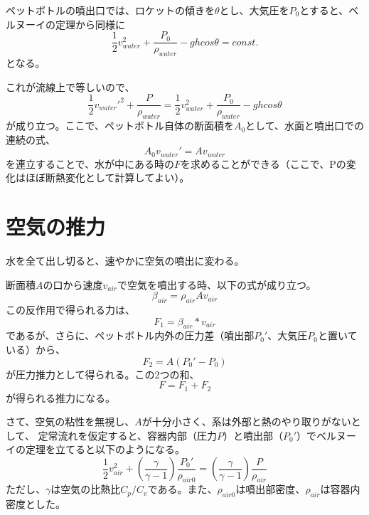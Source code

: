 \documentclass{article}
\begin{document}
ペットボトルの噴出口では、ロケットの傾きを$\theta$とし、大気圧を$P_0$とすると、ベルヌーイの定理から同様に
\begin{equation}
\frac{1}{2} v_{water}^2 + \frac{P_0}{\rho_{water}} - g h cos \theta = const.
\end{equation}
となる。

これが流線上で等しいので、
\begin{equation}
\frac{1}{2} v_{water}'^2 + \frac{P}{\rho_{water}} = \frac{1}{2} v_{water}^2 + \frac{P_0}{\rho_{water}} - g h cos \theta
\end{equation}
が成り立つ。ここで、ペットボトル自体の断面積を$A_0$として、水面と噴出口での連続の式、
\begin{equation}
A_0 v_{water}' = A v_{water}
\end{equation}
を連立することで、水が中にある時の$F$を求めることができる（ここで、Pの変化はほぼ断熱変化として計算してよい）。

\section{ 空気の推力 }

水を全て出し切ると、速やかに空気の噴出に変わる。

断面積$A$の口から速度$v_{air}$で空気を噴出する時、以下の式が成り立つ。
\begin{equation}
\beta_{air} = \rho_{air} A v_{air}
\end{equation}
この反作用で得られる力は、
\begin{equation}
F_1 = \beta_{air} * v_{air}
\end{equation}
であるが、さらに、ペットボトル内外の圧力差（噴出部$P_0'$、大気圧$P_0$と置いている）から、
\begin{equation}
F_2 = A \left( P_0' - P_0 \right)
\end{equation}
が圧力推力として得られる。この2つの和、
\begin{equation}
F = F_1 + F_2
\end{equation}
が得られる推力になる。

さて、空気の粘性を無視し、$A$が十分小さく、系は外部と熱のやり取りがないとして、
定常流れを仮定すると、容器内部（圧力$P$）と噴出部（$P_0'$）でベルヌーイの定理を立てると以下のようになる。
\begin{equation}
\frac{1}{2} v_{air}^2 + \left( \frac{\gamma}{\gamma - 1} \right)\frac{P_0'}{\rho_{air0}} =  \left( \frac{\gamma}{\gamma - 1} \right)\frac{P}{\rho_{air}}
\end{equation}
ただし、$\gamma$は空気の比熱比${C_p}/{C_v}$である。また、$\rho_{air0}$は噴出部密度、$\rho_{air}$は容器内密度とした。
\end{document}
